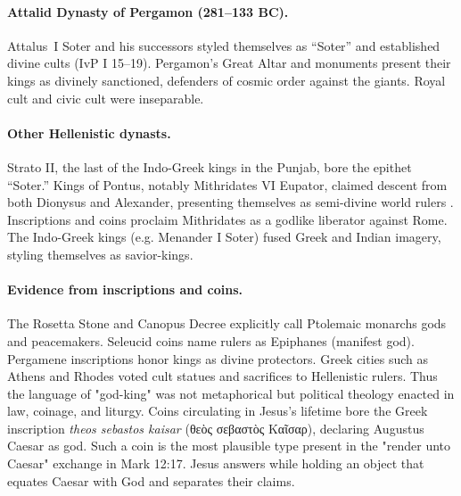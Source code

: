 \paragraph{Attalid Dynasty of Pergamon (281--133 BC).}
Attalus~I Soter and his successors styled themselves as ``Soter'' and established divine cults (IvP I 15--19).
Pergamon’s Great Altar and monuments present their kings as divinely sanctioned, defenders of cosmic order against the giants.
Royal cult and civic cult were inseparable.

\paragraph{Other Hellenistic dynasts.}
Strato II, the last of the Indo-Greek kings in the Punjab, bore the epithet “Soter.”
Kings of Pontus, notably Mithridates VI Eupator, claimed descent from both Dionysus and Alexander, presenting themselves as semi-divine world rulers \cite{appian:romanhistory}.
Inscriptions and coins proclaim Mithridates as a godlike liberator against Rome.
The Indo-Greek kings (e.g. Menander I Soter) fused Greek and Indian imagery, styling themselves as savior-kings.

\paragraph{Evidence from inscriptions and coins.}
The Rosetta Stone and Canopus Decree explicitly call Ptolemaic monarchs gods and peacemakers.
Seleucid coins name rulers as Epiphanes (manifest god).
Pergamene inscriptions honor kings as divine protectors.
Greek cities such as Athens and Rhodes voted cult statues and sacrifices to Hellenistic rulers.
Thus the language of "god-king" was not metaphorical but political theology enacted in law, coinage, and liturgy.
Coins circulating in Jesus's lifetime bore the Greek inscription \emph{theos sebastos kaisar} (θεὸς σεβαστὸς Καῖσαρ), declaring Augustus Caesar as god.
Such a coin is the most plausible type present in the "render unto Caesar" exchange in Mark 12:17.
Jesus answers while holding an object that equates Caesar with God and separates their claims.

